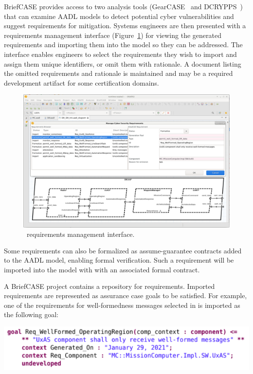 BriefCASE provides access to two analysis tools (GearCASE~\cite{gearcase2020} and
DCRYPPS~\cite{dcrypps2019}) that can examine AADL models to detect potential cyber vulnerabilities
and suggest requirements for mitigation.
%
Systems engineers are then presented with a requirements management interface
(Figure~\ref{fig:req-mgmt}) for viewing the generated requirements and importing them into the model
so they can be addressed. The interface enables engineers to select the requirements they wish to
import and assign them unique identifiers, or omit them with rationale. A document listing the omitted
requirements and rationale is maintained and may be a required development artifact for some
certification domains. 

\begin{figure}[h]
	\centering
	\includegraphics[width=\textwidth]{figs/req-mgmt.png}
	\caption{\briefcase \ requirements management interface.} 
	\label{fig:req-mgmt} 
\end{figure}

Some requirements can also be formalized as assume-guarantee contracts
added to the AADL model, enabling formal verification. 
Such a requirement will be imported into the model with with an associated formal
contract.

A BriefCASE project contains a repository for requirements. Imported requirements are represented 
as assurance case goals to be satisfied. For example, one of the requirements for well-formedness 
messages selected in  is imported as the following goal:

\noindent
\includegraphics[width=1\columnwidth]{figs/req-wellformed-or.png}


